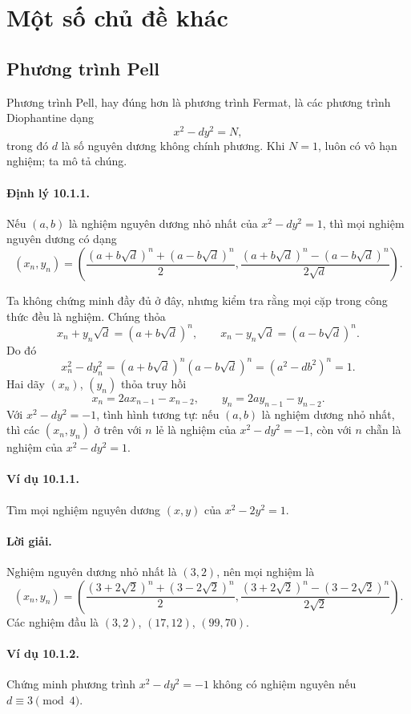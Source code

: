 \documentclass[11pt]{article}
\begin{document}
\section{Một số chủ đề khác}

\subsection{Phương trình Pell}

Phương trình Pell, hay đúng hơn là phương trình Fermat, là các phương trình
Diophantine dạng
\[
 x^2-dy^2=N,
\]
trong đó \(d\) là số nguyên dương không chính phương. Khi \(N=1\), luôn có vô
hạn nghiệm; ta mô tả chúng.

\paragraph{Định lý 10.1.1.}
Nếu \((a,b)\) là nghiệm nguyên dương nhỏ nhất của \(x^2-dy^2=1\), thì mọi
nghiệm nguyên dương có dạng
\[
 (x_n,y_n)=\left(
 \frac{(a+b\sqrt d)^n+(a-b\sqrt d)^n}{2},
 \frac{(a+b\sqrt d)^n-(a-b\sqrt d)^n}{2\sqrt d}
 \right).
\]

Ta không chứng minh đầy đủ ở đây, nhưng kiểm tra rằng mọi cặp trong công thức
đều là nghiệm. Chúng thỏa
\[
 x_n+y_n\sqrt d=(a+b\sqrt d)^n,\qquad
 x_n-y_n\sqrt d=(a-b\sqrt d)^n.
\]
Do đó
\[
 x_n^2-dy_n^2=(a+b\sqrt d)^n(a-b\sqrt d)^n=(a^2-db^2)^n=1.
\]
Hai dãy \((x_n)\), \((y_n)\) thỏa truy hồi
\[
 x_n=2ax_{n-1}-x_{n-2},\qquad y_n=2ay_{n-1}-y_{n-2}.
\]
Với \(x^2-dy^2=-1\), tình hình tương tự: nếu \((a,b)\) là nghiệm dương nhỏ
nhất, thì các \((x_n,y_n)\) ở trên với \(n\) lẻ là nghiệm của
\(x^2-dy^2=-1\), còn với \(n\) chẵn là nghiệm của \(x^2-dy^2=1\).

\paragraph{Ví dụ 10.1.1.}
Tìm mọi nghiệm nguyên dương \((x,y)\) của \(x^2-2y^2=1\).

\paragraph{Lời giải.}
Nghiệm nguyên dương nhỏ nhất là \((3,2)\), nên mọi nghiệm là
\[
 (x_n,y_n)=\left(
 \frac{(3+2\sqrt2)^n+(3-2\sqrt2)^n}{2},
 \frac{(3+2\sqrt2)^n-(3-2\sqrt2)^n}{2\sqrt2}
 \right).
\]
Các nghiệm đầu là \((3,2)\), \((17,12)\), \((99,70)\).

\paragraph{Ví dụ 10.1.2.}
Chứng minh phương trình \(x^2-dy^2=-1\) không có nghiệm nguyên nếu
\(d\equiv3\pmod4\).
\end{document}
